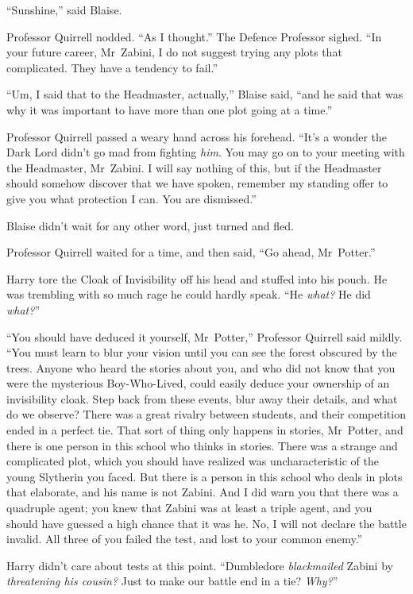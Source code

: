 “Sunshine,” said Blaise.

Professor Quirrell nodded. “As I thought.” The Defence Professor sighed. “In your future career, Mr~Zabini, I do not suggest trying any plots that complicated. They have a tendency to fail.”

“Um, I said that to the Headmaster, actually,” Blaise said, “and he said that was why it was important to have more than one plot going at a time.”

Professor Quirrell passed a weary hand across his forehead. “It’s a wonder the Dark Lord didn’t go mad from fighting \emph{him}. You may go on to your meeting with the Headmaster, Mr~Zabini. I will say nothing of this, but if the Headmaster should somehow discover that we have spoken, remember my standing offer to give you what protection I can. You are dismissed.”

Blaise didn’t wait for any other word, just turned and fled.

\later

Professor Quirrell waited for a time, and then said, “Go ahead, Mr~Potter.”

Harry tore the Cloak of Invisibility off his head and stuffed into his pouch. He was trembling with so much rage he could hardly speak. “He \emph{what?} He did \emph{what?}”

“You should have deduced it yourself, Mr~Potter,” Professor Quirrell said mildly. “You must learn to blur your vision until you can see the forest obscured by the trees. Anyone who heard the stories about you, and who did not know that you were the mysterious Boy-Who-Lived, could easily deduce your ownership of an invisibility cloak. Step back from these events, blur away their details, and what do we observe? There was a great rivalry between students, and their competition ended in a perfect tie. That sort of thing only happens in stories, Mr~Potter, and there is one person in this school who thinks in stories. There was a strange and complicated plot, which you should have realized was uncharacteristic of the young Slytherin you faced. But there is a person in this school who deals in plots that elaborate, and his name is not Zabini. And I did warn you that there was a quadruple agent; you knew that Zabini was at least a triple agent, and you should have guessed a high chance that it was he. No, I will not declare the battle invalid. All three of you failed the test, and lost to your common enemy.”

Harry didn’t care about tests at this point. “Dumbledore \emph{blackmailed} Zabini by \emph{threatening his cousin?} Just to make our battle end in a tie? \emph{Why?}”

